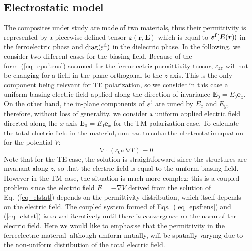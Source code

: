 \documentclass[%
 reprint,
 amsmath,amssymb,
 aps,
]{revtex4-2}
\newcommand{\B}{\boldsymbol}
\newcommand{\tens}[1]{\B{#1}}
\newcommand{\grad}{\B{\mathrm{\nabla}}}
\renewcommand{\div}{\B{\mathrm{\nabla\cdotp}}}
\newcommand{\epsftens}{\tens{\varepsilon}^{\rm f}}
\newcommand{\epstens}{\tens{\varepsilon}}
\newcommand{\epsd}{\varepsilon^{\rm d}}
\newcommand{\epsvac}{\varepsilon_{0}}
\newcommand{\equ}[1]{Eq.~(\ref{#1})}
\begin{document}
\subsection*{Electrostatic model}
The composites under study are made of two materials, thus their permittivity
is represented by a piecewise defined tensor $\epstens(\B r, \B E)$ which is
equal to $\epsftens(\B E(\B r))$ in the ferroelectric phase and ${\rm diag}(\epsd)$
in the dielectric phase.
In the following, we consider two different cases for the biasing field.
Because of the form~(\ref{eq_epsftens}) assumed for the ferroelectric permittivity
tensor, $\varepsilon_{zz}$ will not be changing for a field in the plane orthogonal
to the $z$ axis. This is the only component
being relevant for TE polarization, so we consider in this case a uniform biasing
electric field applied along the direction of invariance $\B E_0 = E_{0} \B e_z$.
On the other hand,
the in-plane components of $\epsftens$ are tuned by $E_x$ and $E_y$, therefore,
without loss of generality,
we consider a uniform applied electric field directed along the $x$ axis
$\B E_0 = E_{0} \B e_x$ for the TM polarization case.
To calculate the total electric field in the material, one
has to solve the electrostatic equation for the potential $V$:
\begin{equation}
\div (\epsvac \epstens \grad V) = 0
\label{eq_elstat}
\end{equation}
Note that for the TE case, the solution is straightforward since the structures
are invariant along $z$, so that the electric field is equal to the uniform biasing field.
However in the TM case, the situation is much more complex: this is a coupled problem since the
electric field $E=-\grad V$ derived from the
solution of \equ{eq_elstat} depends on the permittivity distribution, which
itself depends on the electric field.
The coupled system formed
of Eqs.~(\ref{eq_epsftens}) and (\ref{eq_elstat}) is solved iteratively until there
is convergence on the norm of the electric field.
Here we would like to emphasise that the permittivity in the ferroelectric material, although
uniform initially, will be spatially varying due to the non-uniform distribution
of the total electric field.\\

\end{document}
